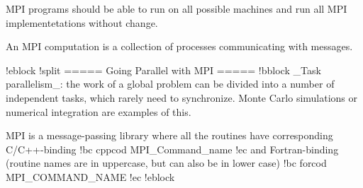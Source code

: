 MPI programs should be able to run
on all possible machines and run all MPI implementetations without change.

An MPI computation is a collection of processes communicating with messages.


!eblock
!split
===== Going Parallel with MPI =====
!bblock
_Task parallelism_: the work of a global problem can be divided
into a number of independent tasks, which rarely need to synchronize. 
Monte Carlo simulations or numerical integration are examples of this.


MPI is a message-passing library where all the routines
have corresponding C/C++-binding
!bc cppcod
   MPI_Command_name
!ec
and Fortran-binding (routine names are in uppercase, but can also be in lower case)
!bc forcod
   MPI_COMMAND_NAME
!ec
!eblock


